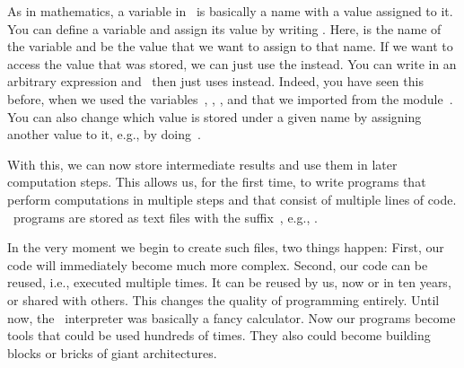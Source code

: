 %
%
%
As in mathematics, a variable in \python\ is basically a name with a value assigned to it.
You can define a variable and assign its value by writing .
Here,  is the name of the variable and  be the value that we want to assign to that name.
If we want to access the value that was stored, we can just use the  instead.
You can write  in an arbitrary expression and \python\ then just uses  instead.
Indeed, you have seen this before, when we used the variables~, , , and  that we imported from the module~.
You can also change which value is stored under a given name by assigning another value to it, e.g., by doing~.

With this, we can now store intermediate results and use them in later computation steps.
This allows us, for the first time, to write programs that perform computations in multiple steps and that consist of multiple lines of code.
\python\ programs are stored as text files with the suffix~, e.g., .

In the very moment we begin to create such files, two things happen:
First, our code will immediately become much more complex.
Second, our code can be reused, i.e., executed multiple times.
It can be reused by us, now or in ten years, or shared with others.
This changes the quality of programming entirely.
Until now, the \python\ interpreter was basically a fancy calculator.
Now our programs become tools that could be used hundreds of times.
They also could become building blocks or bricks of giant architectures.

